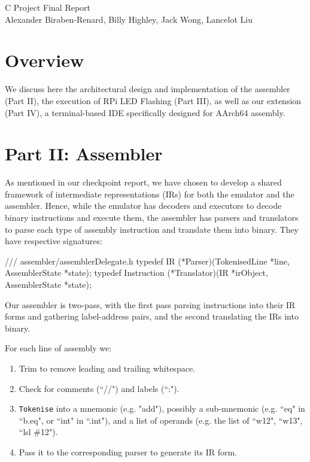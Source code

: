 \documentclass{ictex}
\begin{document}
\begin{center}
    { \huge C Project Final Report } \\
    \vspace{3mm}
    { Alexander Biraben-Renard, Billy Highley, Jack Wong, Lancelot Liu }
\end{center} \vspace{1em}

\section{Overview}

We discuss here the architectural design and implementation of the assembler (Part II), the execution of RPi LED Flashing (Part III), as well as our extension (Part IV), a terminal-based IDE specifically designed for AArch64 assembly.

\section{Part II: Assembler}

As mentioned in our checkpoint report, we have chosen to develop a shared framework of intermediate representations (IRs) for both the emulator and the assembler. Hence, while the emulator has decoders and executors to decode binary instructions and execute them, the assembler has parsers and translators to parse each type of assembly instruction and translate them into binary. They have respective signatures:

\begin{code}
    /// assembler/assemblerDelegate.h
    typedef IR (*Parser)(TokenisedLine *line, AssemblerState *state);
    typedef Instruction (*Translator)(IR *irObject, AssemblerState *state);
\end{code}

Our assembler is two-pass, with the first pass parsing instructions into their IR forms and gathering label-address pairs, and the second translating the IRs into binary.

For each line of assembly we:

\begin{enumerate}
    \item Trim to remove leading and trailing whitespace.
    \item Check for comments (``//") and labels (``:").
    \item \texttt{Tokenise} into a mnemonic (e.g. "add"), possibly a sub-mnemonic (e.g. ``eq" in ``b.eq", or ``int" in ``.int"), and a list of operands (e.g. the list of ``w12", ``w13", ``lsl \#12").
    \item Pass it to the corresponding parser to generate its IR form.
\end{enumerate}
\end{document}
